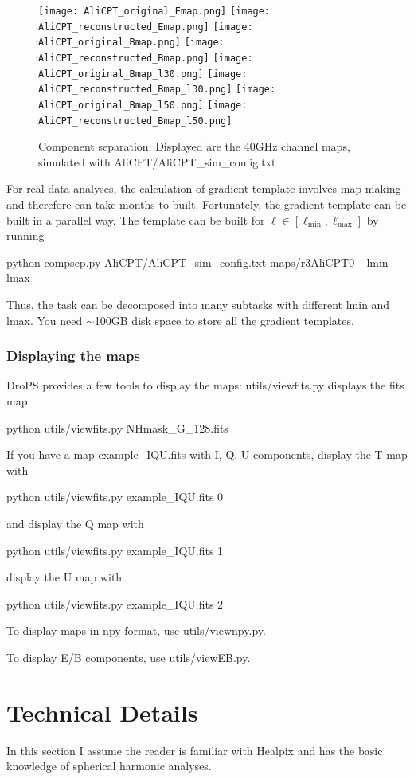 \documentclass[12pt, a4paper]{ctexart} %
\def\tbox#1{\begin{tcolorbox}#1\end{tcolorbox}}
\begin{document}
\begin{figure}
  \texttt{[image: AliCPT\_original\_Emap.png]}%
  \texttt{[image: AliCPT\_reconstructed\_Emap.png]}  
  \texttt{[image: AliCPT\_original\_Bmap.png]}%
  \texttt{[image: AliCPT\_reconstructed\_Bmap.png]}  
  \texttt{[image: AliCPT\_original\_Bmap\_l30.png]}%
  \texttt{[image: AliCPT\_reconstructed\_Bmap\_l30.png]}
  \texttt{[image: AliCPT\_original\_Bmap\_l50.png]}%
  \texttt{[image: AliCPT\_reconstructed\_Bmap\_l50.png]}
  \caption{Component separation; Displayed are the 40GHz channel maps, simulated with AliCPT/AliCPT\_sim\_config.txt \label{fig:compsep}}
\end{figure}

For real data analyses, the calculation of gradient template involves map making and therefore can take months to built. Fortunately, the gradient template can be built in a parallel way. The template can be built for $\ell \in [\ell_{\min}, \ell_{\max}]$ by running
\tbox{python compsep.py AliCPT/AliCPT\_sim\_config.txt maps/r3AliCPT0\_ lmin lmax}
Thus, the task can be decomposed into many subtasks with different lmin and lmax. You need $\sim$100GB disk space to store all the gradient templates.



\subsubsection{Displaying the maps}

DroPS provides a few tools to display the maps: utils/viewfits.py displays the fits map.

\tbox{python utils/viewfits.py NHmask\_G\_128.fits}

If you have a map example\_IQU.fits with I, Q, U components, display the T map with
\tbox{python utils/viewfits.py example\_IQU.fits 0}
and display the Q map with
\tbox{python utils/viewfits.py example\_IQU.fits 1}
display the U map with
\tbox{python utils/viewfits.py example\_IQU.fits 2}


To display maps in npy format, use utils/viewnpy.py.

To display E/B components, use utils/viewEB.py.

\section{Technical Details}

In this section I assume the reader is familiar with Healpix and has the basic knowledge of spherical harmonic analyses.
\end{document}
